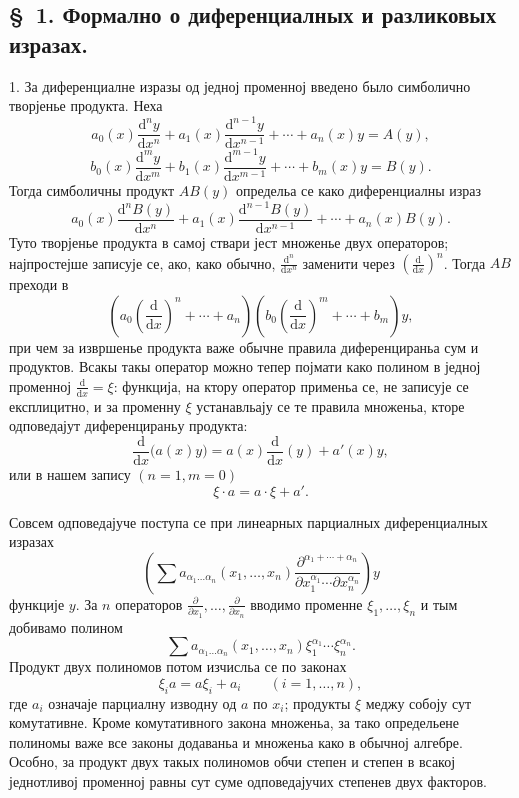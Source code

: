 ﻿\documentclass[11pt]{article}
\providecommand{\dd}{\mathrm d}
\providecommand{\p}{\partial}
\begin{document}
\subsection*{\S~1. Формално о диференциалных и разликовых изразах.}

1. За диференциалне изразы од једној променној введено было симболично творјенье продукта. Неха
\[
 a_0(x)\frac{\dd^n y}{\dd x^n}+a_1(x)\frac{\dd^{n-1}y}{\dd x^{n-1}}+\cdots+a_n(x)y=A(y),
\]
\[
 b_0(x)\frac{\dd^m y}{\dd x^m}+b_1(x)\frac{\dd^{m-1}y}{\dd x^{m-1}}+\cdots+b_m(x)y=B(y).
\]
Тогда симболичны продукт \(AB(y)\) определьа се како диференциалны израз
\[
 a_0(x)\frac{\dd^n B(y)}{\dd x^n}+a_1(x)\frac{\dd^{n-1}B(y)}{\dd x^{n-1}}+\cdots+a_n(x)B(y).
\]
Туто творјенье продукта в самој ствари јест множенье двух операторов; најпростејше записује се, ако, како обычно, \(\frac{\dd^n}{\dd x^n}\) заменити через \(\left(\frac{\dd}{\dd x}\right)^n\). Тогда \(AB\) преходи в
\[
 \left(a_0\left(\frac{\dd}{\dd x}\right)^n+\cdots+a_n\right)
 \left(b_0\left(\frac{\dd}{\dd x}\right)^m+\cdots+b_m\right)y,
\]
при чем за извршенье продукта важе обычне правила диференцираньа сум и продуктов. Всакы такы оператор можно тепер појмати како полином в једној променној \(\frac{\dd}{\dd x}=\xi\): функција, на ктору оператор применьа се, не записује се експлицитно, и за променну \(\xi\) устанавльају се те правила множеньа, кторе одповедајут диференцираньу продукта:
\[
 \frac{\dd}{\dd x}\bigl(a(x)y\bigr)=a(x)\frac{\dd}{\dd x}(y)+a'(x)y,
\]
или в нашем запису \((n=1, m=0)\)
\begin{equation}
 \xi\cdot a=a\cdot\xi+a'.
\tag{1}
\end{equation}

Совсем одповедајуче поступа се при линеарных парциалных диференциалных изразах
\[
 \left(\sum a_{\alpha_1\ldots\alpha_n}(x_1,\ldots,x_n)
 \frac{\p^{\alpha_1+\cdots+\alpha_n}}
 {\p x_1^{\alpha_1}\cdots\p x_n^{\alpha_n}}\right)y
\]
функције \(y\). За \(n\) операторов \(\frac{\p}{\p x_1},\ldots,\frac{\p}{\p x_n}\) вводимо променне \(\xi_1,\ldots,\xi_n\) и тым добивамо полином
\[
 \sum a_{\alpha_1\ldots\alpha_n}(x_1,\ldots,x_n)
 \xi_1^{\alpha_1}\cdots\xi_n^{\alpha_n}.
\]
Продукт двух полиномов потом изчисльа се по законах
\begin{equation}
 \xi_i a=a\xi_i+a_i \qquad (i=1,\ldots,n),
\tag{2}
\end{equation}
где \(a_i\) означаје парциалну изводну од \(a\) по \(x_i\); продукты \(\xi\) меджу собоју сут комутативне. Кроме комутативного закона множеньа, за тако определьене полиномы важе все законы додаваньа и множеньа како в обычној алгебре. Особно, за продукт двух такых полиномов обчи степен и степен в всакој једнотливој променној равны сут суме одповедајучих степенев двух факторов.
\end{document}
